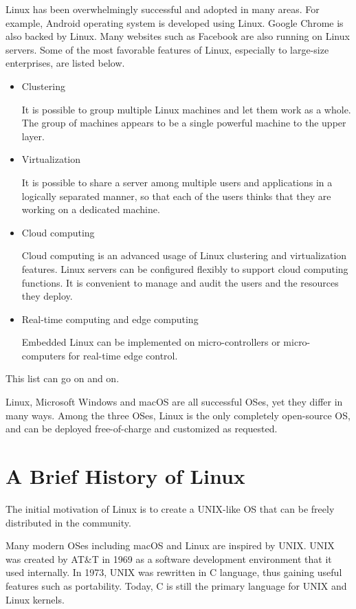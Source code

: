 Linux has been overwhelmingly successful and adopted in many areas. For example, Android operating system is developed using Linux. Google Chrome is also backed by Linux. Many websites such as Facebook are also running on Linux servers. Some of the most favorable features of Linux, especially to large-size enterprises, are listed below.
\begin{itemize}
  \item Clustering
  
  It is possible to group multiple Linux machines and let them work as a whole. The group of machines appears to be a single powerful machine to the upper layer.
  
  \item Virtualization
  
  It is possible to share a server among multiple users and applications in a logically separated manner, so that each of the users thinks that they are working on a dedicated machine.
  
  \item Cloud computing
  
  Cloud computing is an advanced usage of Linux clustering and virtualization features. Linux servers can be configured flexibly to support cloud computing functions. It is convenient to manage and audit the users and the resources they deploy. 
  
  \item Real-time computing and edge computing
  
  Embedded Linux can be implemented on micro-controllers or micro-computers for real-time edge control.
\end{itemize}
This list can go on and on.

Linux, Microsoft Windows and macOS are all successful OSes, yet they differ in many ways. Among the three OSes, Linux is the only completely open-source OS, and can be deployed free-of-charge and customized as requested.

\section{A Brief History of Linux}

The initial motivation of Linux is to create a UNIX-like OS that can be freely distributed in the community.

Many modern OSes including macOS and Linux are inspired by UNIX. UNIX was created by AT\&T in 1969 as a software development environment that it used internally. In 1973, UNIX was rewritten in C language, thus gaining useful features such as portability. Today, C is still the primary language for UNIX and Linux kernels.

